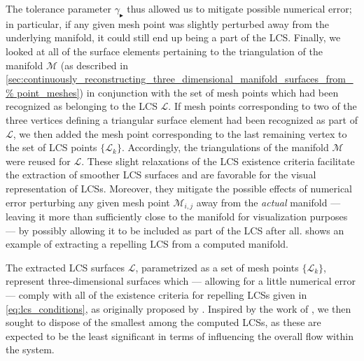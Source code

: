 The tolerance parameter $\gamma_{\blacktriangleright}$ thus allowed us to mitigate possible
numerical error; in particular, if any given mesh point was slightly perturbed
away from the underlying manifold, it could still end up being a part of the
LCS. Finally, we looked at all of the surface elements pertaining to the
triangulation of the manifold $\mathcal{M}$ (as described in
\cref{sec:continuously_reconstructing_three_dimensional_manifold_surfaces_from_%
point_meshes}) in conjunction with the set of mesh points which had been
recognized as belonging to the LCS $\mathcal{L}$. If mesh points corresponding
to two of the three vertices defining a triangular surface element had been
recognized as part of $\mathcal{L}$, we then added the mesh point corresponding
to the last remaining vertex to the set of LCS points $\{\mathcal{L}_{k}\}$.
Accordingly, the triangulations of the manifold $\mathcal{M}$ were reused for
$\mathcal{L}$. These slight relaxations of the LCS existence criteria
facilitate the extraction of smoother LCS surfaces and are favorable for the
visual representation of LCSs. Moreover, they mitigate the possible effects of
numerical error perturbing any given mesh point $\mathcal{M}_{i,j}$ away from
the \emph{actual} manifold --- leaving it more than sufficiently close to the
manifold for visualization purposes --- by possibly allowing it to be included
as part of the LCS after all.  shows an
example of extracting a repelling LCS from a computed manifold.



The extracted LCS surfaces $\mathcal{L}$, parametrized as a set of mesh points
$\{\mathcal{L}_{k}\}$, represent three-dimensional surfaces which --- allowing
for a little numerical error --- comply with all of the existence criteria
for repelling LCSs given in \cref{eq:lcs_conditions}, as originally proposed by
\textcite{haller2011variational}. Inspired by the work of
\textcite{farazmand2012computing}, we then sought to dispose of the smallest
among the computed LCSs, as these are expected to be the least significant in
terms of influencing the overall flow within the system.

